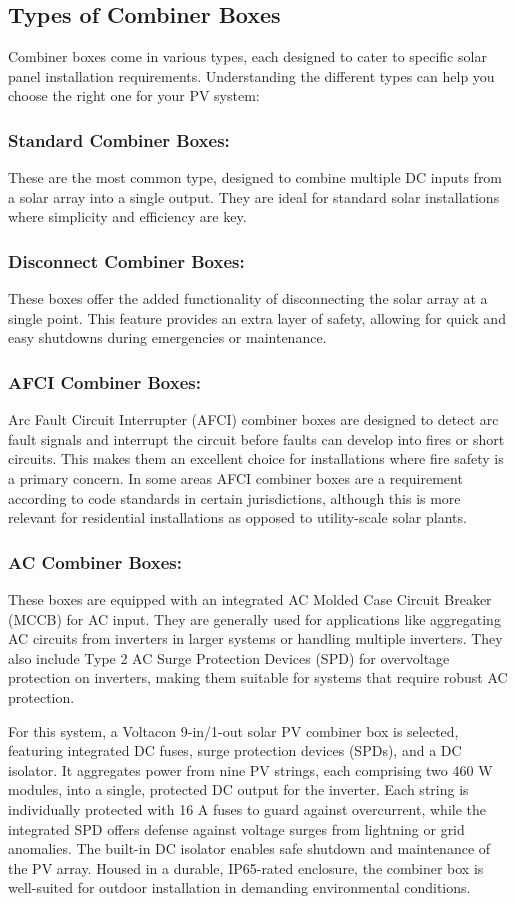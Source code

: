 \documentclass{article}
\begin{document}
\subsection{Types of Combiner Boxes}
Combiner boxes come in various types, each designed to cater to specific solar panel installation requirements. Understanding the different types can help you choose the right one for your PV system:
\subsubsection{Standard Combiner Boxes: }
These are the most common type, designed to combine multiple DC inputs from a solar array into a single output. They are ideal for standard solar installations where simplicity and efficiency are key.
\subsubsection{Disconnect Combiner Boxes: }
These boxes offer the added functionality of disconnecting the solar array at a single point. This feature provides an extra layer of safety, allowing for quick and easy shutdowns during emergencies or maintenance.
\subsubsection{AFCI Combiner Boxes: }
Arc Fault Circuit Interrupter (AFCI) combiner boxes are designed to detect arc fault signals and interrupt the circuit before faults can develop into fires or short circuits. This makes them an excellent choice for installations where fire safety is a primary concern. In some areas AFCI combiner boxes are a requirement according to code standards in certain jurisdictions, although this is more relevant for residential installations as opposed to utility-scale solar plants.
\subsubsection{AC Combiner Boxes: }
These boxes are equipped with an integrated AC Molded Case Circuit Breaker (MCCB) for AC input. They are generally used for applications like aggregating AC circuits from inverters in larger systems or handling multiple inverters. They also include Type 2 AC Surge Protection Devices (SPD) for overvoltage protection on inverters, making them suitable for systems that require robust AC protection.\bigskip

   For this system, a Voltacon 9-in/1-out solar PV combiner box is selected, featuring integrated DC fuses, surge protection devices (SPDs), and a DC isolator. It aggregates power from nine PV strings, each comprising two 460 W modules, into a single, protected DC output for the inverter. Each string is individually protected with 16 A fuses to guard against overcurrent, while the integrated SPD offers defense against voltage surges from lightning or grid anomalies. The built-in DC isolator enables safe shutdown and maintenance of the PV array. Housed in a durable, IP65-rated enclosure, the combiner box is well-suited for outdoor installation in demanding environmental conditions. 
\end{document}
